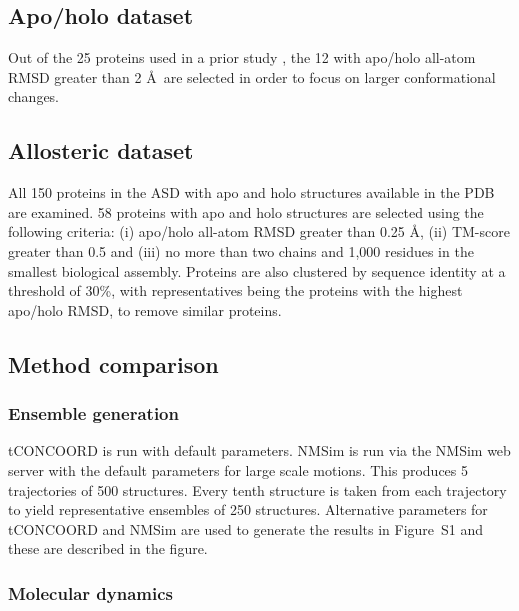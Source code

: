 \subsection{Apo/holo dataset}

Out of the 25 proteins used in a prior study \cite{Atilgan2010}, the 12 with apo/holo all-atom RMSD greater than 2 \AA\ are selected in order to focus on larger conformational changes.


\subsection{Allosteric dataset}

All 150 proteins in the ASD \cite{Shen2016} with apo and holo structures available in the PDB are examined.
58 proteins with apo and holo structures are selected using the following criteria: (i) apo/holo all-atom RMSD greater than 0.25 \AA, (ii) TM-score greater than 0.5 and (iii) no more than two chains and 1,000 residues in the smallest biological assembly.
Proteins are also clustered by sequence identity at a threshold of 30\%, with representatives being the proteins with the highest apo/holo RMSD, to remove similar proteins.


\subsection{Method comparison}

\subsubsection{Ensemble generation}

tCONCOORD \cite{Seeliger2007} is run with default parameters.
NMSim is run via the NMSim web server \cite{Kruger2012} with the default parameters for large scale motions.
This produces 5 trajectories of 500 structures. Every tenth structure is taken from each trajectory to yield representative ensembles of 250 structures.
Alternative parameters for tCONCOORD and NMSim are used to generate the results in Figure~S1 and these are described in the figure.


\subsubsection{Molecular dynamics}


